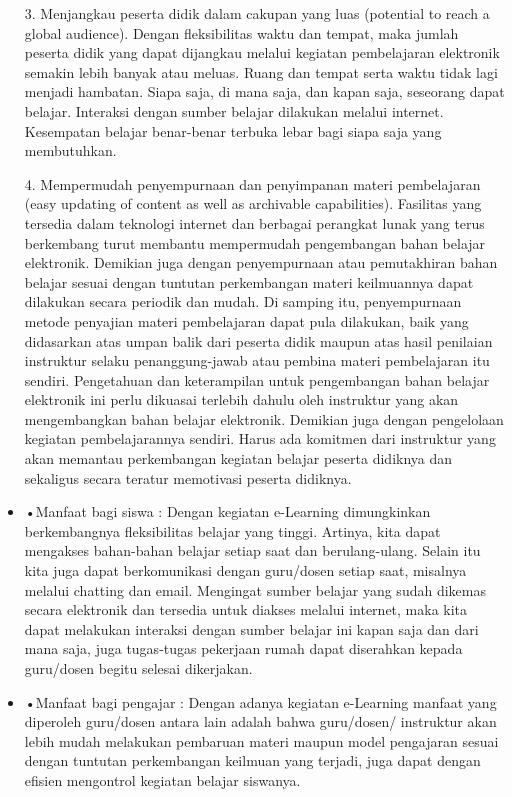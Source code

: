 \documentclass{jtetiproposalskripsi}
\begin{document}
\begin{itemize}
\item[3.]Menjangkau peserta didik dalam cakupan yang luas (potential to reach a global audience). Dengan fleksibilitas waktu dan tempat, maka jumlah peserta didik yang dapat dijangkau melalui kegiatan pembelajaran elektronik semakin lebih banyak atau meluas. Ruang dan tempat serta waktu tidak lagi menjadi hambatan. Siapa saja, di mana saja, dan kapan saja, seseorang dapat belajar. Interaksi dengan sumber belajar dilakukan melalui internet. Kesempatan belajar benar-benar terbuka lebar bagi siapa saja yang membutuhkan.
\item[4.]Mempermudah penyempurnaan dan penyimpanan materi pembelajaran (easy updating of content as well as archivable capabilities). Fasilitas yang tersedia dalam teknologi internet dan berbagai perangkat lunak yang terus berkembang turut membantu mempermudah pengembangan bahan belajar elektronik. Demikian juga dengan penyempurnaan atau pemutakhiran bahan belajar sesuai dengan tuntutan perkembangan materi keilmuannya dapat dilakukan secara periodik dan mudah. Di samping itu, penyempurnaan metode penyajian materi pembelajaran dapat pula dilakukan, baik yang didasarkan atas umpan balik dari peserta didik maupun atas hasil penilaian instruktur selaku penanggung-jawab atau pembina materi pembelajaran itu sendiri. Pengetahuan dan keterampilan untuk pengembangan bahan belajar elektronik ini perlu dikuasai terlebih dahulu oleh instruktur yang akan mengembangkan bahan belajar elektronik. Demikian juga dengan pengelolaan kegiatan pembelajarannya sendiri. Harus ada komitmen dari instruktur yang akan memantau perkembangan kegiatan belajar peserta didiknya dan sekaligus secara teratur memotivasi peserta didiknya.

\item •Manfaat bagi siswa :
Dengan kegiatan e-Learning dimungkinkan berkembangnya fleksibilitas belajar yang tinggi. Artinya, kita dapat mengakses bahan-bahan belajar setiap saat dan berulang-ulang. Selain itu kita juga dapat berkomunikasi dengan guru/dosen setiap saat, misalnya melalui chatting dan email. Mengingat sumber belajar yang sudah dikemas secara elektronik dan tersedia untuk diakses melalui internet, maka kita dapat melakukan interaksi dengan sumber belajar ini kapan saja dan dari mana saja, juga tugas-tugas pekerjaan rumah dapat diserahkan kepada guru/dosen begitu selesai dikerjakan. 
\item •Manfaat bagi pengajar :
Dengan adanya kegiatan e-Learning manfaat yang diperoleh guru/dosen antara lain adalah bahwa guru/dosen/ instruktur akan lebih mudah melakukan pembaruan materi maupun model pengajaran sesuai dengan tuntutan perkembangan keilmuan yang terjadi, juga dapat dengan efisien mengontrol kegiatan belajar siswanya. 
\end{itemize}
\end{document}
